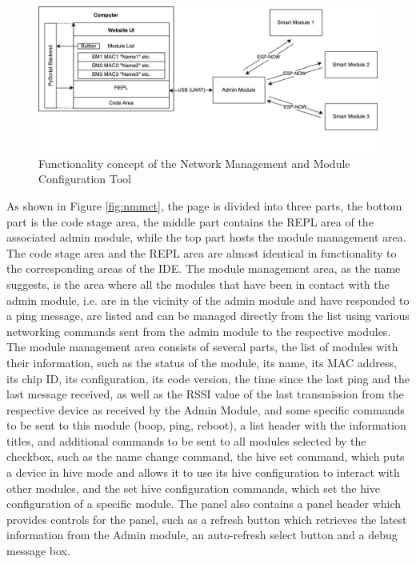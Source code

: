 \begin{figure}[H]
    \centering
    \includegraphics[width=\linewidth]{overleaf/images/backend.png}
    \vspace{\ftspace}
    \caption{Functionality concept of the Network Management and Module Configuration Tool}
    \vspace{\ftspace}
    \label{fig:nmmct_concept}
\end{figure}

As shown in Figure \ref{fig:nmmct}, the page is divided into three parts, the bottom part is the code stage area, the middle part contains the REPL area of the associated admin module, while the top part hosts the module management area. 
The code stage area and the REPL area are almost identical in functionality to the corresponding areas of the IDE. 
The module management area, as the name suggests, is the area where all the modules that have been in contact with the admin module, i.e. are in the vicinity of the admin module and have responded to a ping message, are listed and can be managed directly from the list using various networking commands sent from the admin module to the respective modules. The module management area consists of several parts, the list of modules with their information, such as the status of the module, its name, its MAC address, its chip ID, its configuration, its code version, the time since the last ping and the last message received, as well as the RSSI value of the last transmission from the respective device as received by the Admin Module, and some specific commands to be sent to this module (boop, ping, reboot), a list header with the information titles, and additional commands to be sent to all modules selected by the checkbox, such as the name change command, the hive set command, which puts a device in hive mode and allows it to use its hive configuration to interact with other modules, and the set hive configuration commands, which set the hive configuration of a specific module. The panel also contains a panel header which provides controls for the panel, such as a refresh button which retrieves the latest information from the Admin module, an auto-refresh select button and a debug message box.

